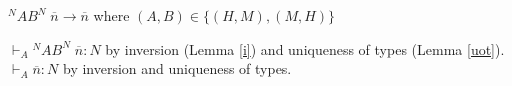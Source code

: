 \begin{case}
$^{N}AB^{N}\;\overline{n}\rightarrow\overline{n}$ where $(A,B)\in\lbrace(H,M),(M,H)\rbrace$

$\vdash_{A}{^{N}A}B^{N}\;\overline{n}:N$ by inversion (Lemma \ref{i}) and uniqueness of types (Lemma \ref{uot}).  $\vdash_{A}\overline{n}:N$ by inversion and uniqueness of types.
\end{case}